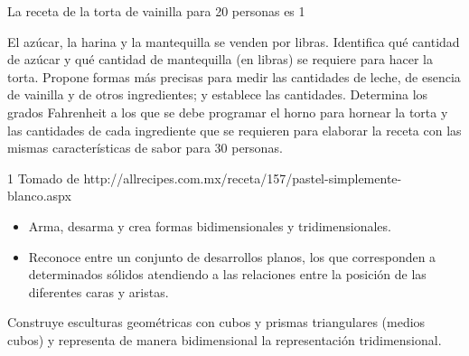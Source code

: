\ejemplo

La receta de la torta de vainilla para 20 personas es 1


El azúcar, la harina y la mantequilla se venden por libras. Identifica qué cantidad de azúcar y qué cantidad de mantequilla (en libras) se requiere para hacer la torta. Propone formas más precisas para medir las cantidades de leche, de esencia de vainilla y de otros ingredientes; y establece las cantidades. Determina los grados Fahrenheit a los que se debe programar el horno para hornear la torta y las cantidades de cada ingrediente que se requieren para elaborar la receta con las mismas características de sabor para 30 personas.

1 Tomado de http://allrecipes.com.mx/receta/157/pastel-simplemente-blanco.aspx



\evidencias

\begin{itemize}
  \item Arma, desarma y crea formas bidimensionales y tridimensionales.
  \item Reconoce entre un conjunto de desarrollos planos, los que corresponden a determinados sólidos atendiendo a las relaciones entre la posición de las diferentes caras y aristas.
\end{itemize}

\ejemplo

Construye esculturas geométricas con cubos y prismas triangulares (medios cubos) y representa de manera bidimensional la representación tridimensional.





\evidencias

